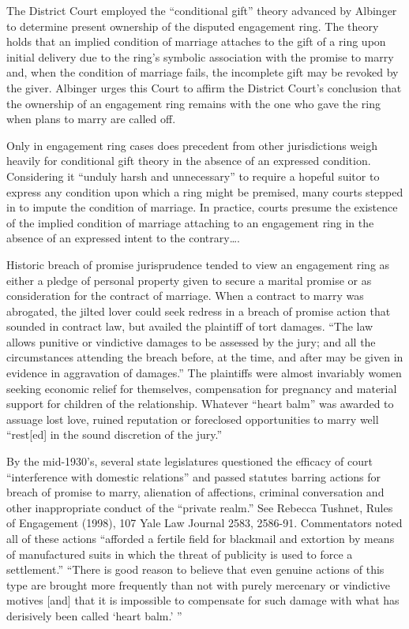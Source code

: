 The District Court employed the ``conditional gift'' theory advanced by Albinger
to determine present ownership of the disputed engagement ring. The theory
holds that an implied condition of marriage attaches to the gift of a ring upon
initial delivery due to the  ring's symbolic association with the promise to
marry and, when the condition of marriage fails, the incomplete gift may be
revoked by the giver. Albinger urges this Court to affirm the District Court's
conclusion that the ownership of an engagement ring remains with the one who
gave the ring when plans to marry are called off.

Only in engagement ring cases does precedent from other jurisdictions weigh
heavily for conditional gift theory in the absence of an expressed condition.
Considering it ``unduly harsh and unnecessary'' to require a hopeful suitor to
express any condition upon which a ring might be premised, many courts stepped
in to impute the condition of marriage. In practice, courts presume the
existence of the implied condition of marriage attaching to an engagement ring
in the absence of an expressed intent to the contrary\dots{}.


Historic breach of promise jurisprudence tended to view an engagement ring as
either a pledge of personal property given to secure a marital promise or as
consideration for the contract of marriage. When a contract to marry was
abrogated, the jilted lover could seek redress in a breach of promise action
that sounded in contract law, but availed the plaintiff of tort damages. ``The
law allows punitive or vindictive damages to be assessed by the jury; and all
the circumstances attending the breach before, at the time, and after may be
given in evidence in aggravation of damages.'' The plaintiffs were almost
invariably women seeking economic relief for themselves, compensation for
pregnancy and material support for children of the relationship. Whatever
``heart balm'' was awarded to assuage lost love, ruined reputation or
foreclosed opportunities to marry well ``rest[ed] in the sound discretion of
the jury.'' 

By the mid-1930's, several state legislatures questioned the efficacy of court
``interference with domestic relations'' and passed statutes barring actions
for breach of promise to marry, alienation of affections, criminal conversation
and other inappropriate conduct of the ``private realm.'' See Rebecca Tushnet,
Rules of Engagement (1998), 107 Yale Law Journal 2583, 2586-91. Commentators
noted all of these  actions ``afforded a fertile field for blackmail and
extortion by means of manufactured suits in which the threat of publicity is
used to force a settlement.'' ``There is good reason to believe that even
genuine actions of this type are brought more frequently than not with purely
mercenary or vindictive motives [and] that it is impossible to compensate for
such damage with what has derisively been called `heart balm.' '' 

